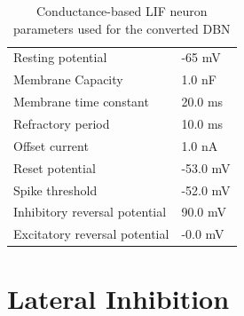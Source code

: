 \begin{table}[h!]
\caption{Conductance-based LIF neuron parameters used for the converted DBN}
\centering
\label{cobalifparam}
\begin{tabularx}{0.65\textwidth}{|XX|}
\hline
Resting potential    			& -65 mV 		    \\
Membrane Capacity    			& 1.0 nF 		     \\
Membrane time constant    		& 20.0 ms		             \\
Refractory period     			& 10.0 ms		                 \\
Offset current    				& 1.0 nA		              \\
Reset potential     			& -53.0 mV 	               \\
Spike threshold     			& -52.0 mV          \\
Inhibitory reversal potential  & 90.0 mV	              \\
Excitatory reversal potential  & -0.0 mV 	               \\\hline
\end{tabularx}
\end{table}
   
\pagebreak   
   
\section{Lateral Inhibition}   
   
